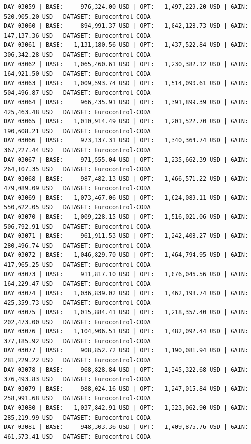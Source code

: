\documentclass[11pt,a4paper]{article}
\begin{document}
\begin{verbatim}
DAY 03059 | BASE:     976,324.00 USD | OPT:   1,497,229.20 USD | GAIN: 520,905.20 USD | DATASET: Eurocontrol-CODA
DAY 03060 | BASE:     894,991.37 USD | OPT:   1,042,128.73 USD | GAIN: 147,137.36 USD | DATASET: Eurocontrol-CODA
DAY 03061 | BASE:   1,131,180.56 USD | OPT:   1,437,522.84 USD | GAIN: 306,342.28 USD | DATASET: Eurocontrol-CODA
DAY 03062 | BASE:   1,065,460.61 USD | OPT:   1,230,382.12 USD | GAIN: 164,921.50 USD | DATASET: Eurocontrol-CODA
DAY 03063 | BASE:   1,009,593.74 USD | OPT:   1,514,090.61 USD | GAIN: 504,496.87 USD | DATASET: Eurocontrol-CODA
DAY 03064 | BASE:     966,435.91 USD | OPT:   1,391,899.39 USD | GAIN: 425,463.48 USD | DATASET: Eurocontrol-CODA
DAY 03065 | BASE:   1,010,914.49 USD | OPT:   1,201,522.70 USD | GAIN: 190,608.21 USD | DATASET: Eurocontrol-CODA
DAY 03066 | BASE:     973,137.31 USD | OPT:   1,340,364.74 USD | GAIN: 367,227.44 USD | DATASET: Eurocontrol-CODA
DAY 03067 | BASE:     971,555.04 USD | OPT:   1,235,662.39 USD | GAIN: 264,107.35 USD | DATASET: Eurocontrol-CODA
DAY 03068 | BASE:     987,482.13 USD | OPT:   1,466,571.22 USD | GAIN: 479,089.09 USD | DATASET: Eurocontrol-CODA
DAY 03069 | BASE:   1,073,467.06 USD | OPT:   1,624,089.11 USD | GAIN: 550,622.05 USD | DATASET: Eurocontrol-CODA
DAY 03070 | BASE:   1,009,228.15 USD | OPT:   1,516,021.06 USD | GAIN: 506,792.91 USD | DATASET: Eurocontrol-CODA
DAY 03071 | BASE:     961,911.53 USD | OPT:   1,242,408.27 USD | GAIN: 280,496.74 USD | DATASET: Eurocontrol-CODA
DAY 03072 | BASE:   1,046,829.70 USD | OPT:   1,464,794.95 USD | GAIN: 417,965.25 USD | DATASET: Eurocontrol-CODA
DAY 03073 | BASE:     911,817.10 USD | OPT:   1,076,046.56 USD | GAIN: 164,229.47 USD | DATASET: Eurocontrol-CODA
DAY 03074 | BASE:   1,036,839.02 USD | OPT:   1,462,198.74 USD | GAIN: 425,359.73 USD | DATASET: Eurocontrol-CODA
DAY 03075 | BASE:   1,015,884.41 USD | OPT:   1,218,357.40 USD | GAIN: 202,473.00 USD | DATASET: Eurocontrol-CODA
DAY 03076 | BASE:   1,104,906.51 USD | OPT:   1,482,092.44 USD | GAIN: 377,185.92 USD | DATASET: Eurocontrol-CODA
DAY 03077 | BASE:     908,852.72 USD | OPT:   1,190,081.94 USD | GAIN: 281,229.22 USD | DATASET: Eurocontrol-CODA
DAY 03078 | BASE:     968,828.84 USD | OPT:   1,345,322.68 USD | GAIN: 376,493.83 USD | DATASET: Eurocontrol-CODA
DAY 03079 | BASE:     988,024.16 USD | OPT:   1,247,015.84 USD | GAIN: 258,991.68 USD | DATASET: Eurocontrol-CODA
DAY 03080 | BASE:   1,037,842.91 USD | OPT:   1,323,062.90 USD | GAIN: 285,219.99 USD | DATASET: Eurocontrol-CODA
DAY 03081 | BASE:     948,303.36 USD | OPT:   1,409,876.76 USD | GAIN: 461,573.41 USD | DATASET: Eurocontrol-CODA

\end{verbatim}
\end{document}
